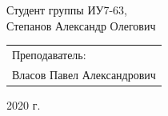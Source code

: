 \begin{titlepage}
\begin{center}
        Студент группы ИУ7-63,\\
        Степанов Александр Олегович
        \vfill
    \end{center}

    \begin{flushright}
        \large
        \begin{tabular}{l}
            Преподаватель: \\
            Власов Павел Александрович \\
        \end{tabular}
    \end{flushright}

   \begin{center}
        2020 г.
    \end{center}

\end{titlepage}

\tableofcontents
